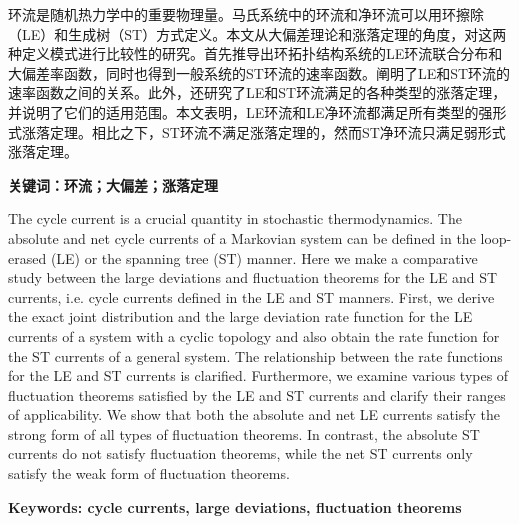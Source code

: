 
\setcounter{page}{1}
\song{}

环流是随机热力学中的重要物理量。马氏系统中的环流和净环流可以用环擦除（LE）和生成树（ST）方式定义。本文从大偏差理论和涨落定理的角度，对这两种定义模式进行比较性的研究。首先推导出环拓扑结构系统的LE环流联合分布和大偏差率函数，同时也得到一般系统的ST环流的速率函数。阐明了LE和ST环流的速率函数之间的关系。此外，还研究了LE和ST环流满足的各种类型的涨落定理，并说明了它们的适用范围。本文表明，LE环流和LE净环流都满足所有类型的强形式涨落定理。相比之下，ST环流不满足涨落定理的，然而ST净环流只满足弱形式涨落定理。


\vspace{\baselineskip}

\hangindent=52.3pt\noindent
{\bfseries\xiaosi\song 关键词：环流；大偏差；涨落定理}
\clearpage


The cycle current is a crucial quantity in stochastic thermodynamics. The absolute and net cycle currents of a Markovian system can be defined in the loop-erased (LE) or the spanning tree (ST) manner. Here we make a comparative study between the large deviations and fluctuation theorems for the LE and ST currents, i.e. cycle currents defined in the LE and ST manners. First, we derive the exact joint distribution and the large deviation rate function for the LE currents of a system with a cyclic topology and also obtain the rate function for the ST currents of a general system. The relationship between the rate functions for the LE and ST currents is clarified. Furthermore, we examine various types of fluctuation theorems satisfied by the LE and ST currents and clarify their ranges of applicability. We show that both the absolute and net LE currents satisfy the strong form of all types of fluctuation theorems. In contrast, the absolute ST currents do not satisfy fluctuation theorems, while the net ST currents only satisfy the weak form of fluctuation theorems.

\vspace{\baselineskip}

\hangindent=60pt\noindent
{\textbf{\xiaosi Keywords: cycle currents, large deviations, fluctuation theorems}}
\clearpage

